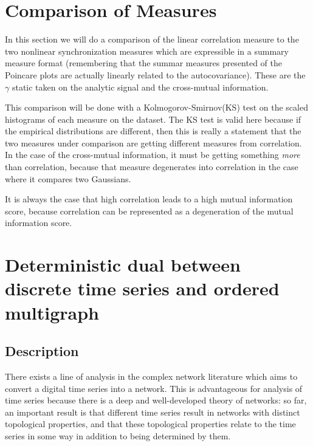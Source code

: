 \documentclass[12pt]{article}
\begin{document}
\section{Comparison of Measures}

In this section we will do a comparison of the linear correlation measure to the two nonlinear synchronization measures which are expressible in a summary measure format (remembering that the summar measures presented of the Poincare plots are actually linearly related to the autocovariance)\cite{kamen}. These are the $\gamma$ static taken on the analytic signal and the cross-mutual information.

This comparison will be done with a Kolmogorov-Smirnov(KS) test on the scaled histograms of each measure on the dataset. The KS test is valid here because if the empirical distributions are different, then this is really a statement that the two measures under comparison are getting different measures from correlation. In the case of the cross-mutual information, it must be getting something \emph{more} than correlation, because that measure degenerates into correlation in the case where it compares two Gaussians.%

It is always the case that high correlation leads to a high mutual information score, because correlation can be represented as a degeneration of the mutual information score.




\section{Deterministic dual between discrete time series and ordered multigraph}

\subsection{Description}

There exists a line of analysis in the complex network literature which aims to convert a digital time series into a network. This is advantageous for analysis of time series because there is a deep and well-developed theory of networks: so far, an important result is that different time series result in networks with distinct topological properties, and that these topological properties relate to the time series in some way in addition to being determined by them\cite{campanharo}.
\end{document}

